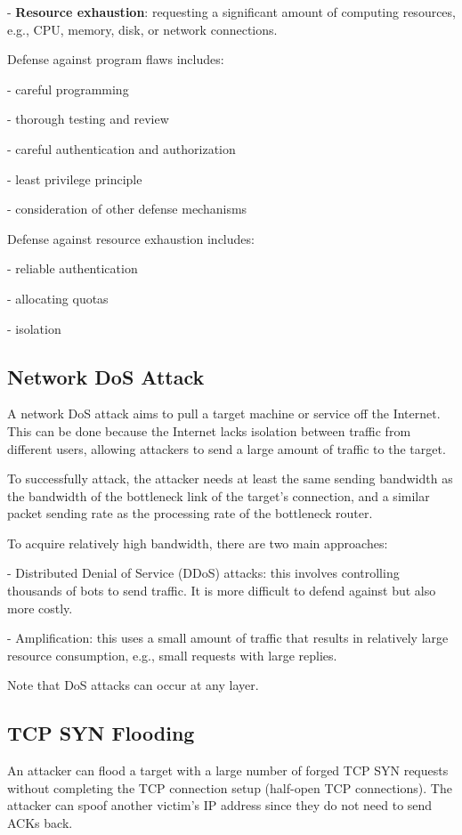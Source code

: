 - \textbf{Resource exhaustion}: requesting a significant amount of computing resources, e.g., CPU, memory, disk, or network connections.  

Defense against program flaws includes:  

- careful programming  

- thorough testing and review  

- careful authentication and authorization  

- least privilege principle  

- consideration of other defense mechanisms  

Defense against resource exhaustion includes:  

- reliable authentication  

- allocating quotas  

- isolation  

\subsection{Network DoS Attack}
A network DoS attack aims to pull a target machine or service off the Internet. This can be done because the Internet lacks isolation between traffic from different users, allowing attackers to send a large amount of traffic to the target. 

To successfully attack, the attacker needs at least the same sending bandwidth as the bandwidth of the bottleneck link of the target's connection, and a similar packet sending rate as the processing rate of the bottleneck router. 

To acquire relatively high bandwidth, there are two main approaches:

- Distributed Denial of Service (DDoS) attacks: this involves controlling thousands of bots to send traffic. It is more difficult to defend against but also more costly.  

- Amplification: this uses a small amount of traffic that results in relatively large resource consumption, e.g., small requests with large replies.  

Note that DoS attacks can occur at any layer.  

\subsection{TCP SYN Flooding}
An attacker can flood a target with a large number of forged TCP SYN requests without completing the TCP connection setup (half-open TCP connections). The attacker can spoof another victim's IP address since they do not need to send ACKs back.  

